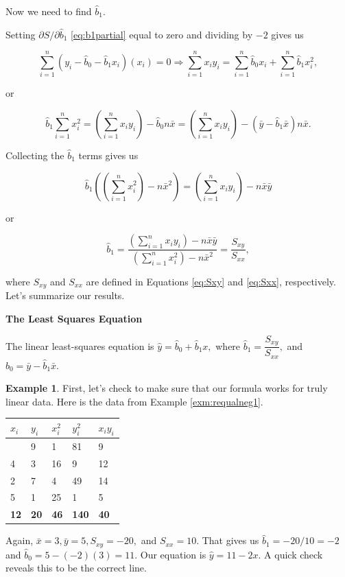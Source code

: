 \documentclass[
]{book}
\theoremstyle{definition}
\theoremstyle{definition}
\newtheorem{example}{Example}[chapter]
\theoremstyle{definition}
\theoremstyle{definition}
\theoremstyle{remark}
\begin{document}
Now we need to find \(\hat{b}_1\).

Setting \(\partial S/\partial \hat{b}_1\) \eqref{eq:b1partial} equal to zero and dividing by \(-2\) gives us

\[\sum_{i=1}^n (y_i-\hat{b}_0-\hat{b}_1x_i)(x_i)=0\Rightarrow \sum_{i=1}^n x_iy_i=\sum_{i=1}^n \hat{b}_0x_i+\sum_{i=1}^n\hat{b}_1x_i^2,\]

or

\[\hat{b}_1\sum_{i=1}^n x_i^2=\left(\sum_{i=1}^nx_iy_i\right)-\hat{b}_0 n\bar{x}=\left(\sum_{i=1}^nx_iy_i\right)-(\bar{y}-\hat{b}_1\bar{x})n\bar{x}.\]

Collecting the \(\hat{b}_1\) terms gives us

\[\hat{b}_1\left(\left(\sum_{i=1}^nx_i^2\right)-n\bar{x}^2\right)=\left(\sum_{i=1}^nx_iy_i\right)-n\bar{x}\bar{y}\]

or

\begin{equation}
\boxed{\hat{b}_1=\frac{\left(\sum_{i=1}^nx_iy_i\right)-n\bar{x}\bar{y}}{\left(\sum_{i=1}^nx_i^2\right)-n\bar{x}^2}=\frac{S_{xy}}{S_{xx}},}
\label{eq:slope}
\end{equation}

where \(S_{xy}\) and \(S_{xx}\) are defined in Equations \eqref{eq:Sxy} and \eqref{eq:Sxx}, respectively. Let's summarize our results.

\begin{propbox}
\textbf{The Least Squares Equation}

The linear least-squares equation is \(\hat{y}=\hat{b}_0+\hat{b}_1 x,\) where \(\hat{b}_1=\dfrac{S_{xy}}{S_{xx}},\) and \(\hat{b}_0=\bar{y}-\hat{b}_1 \bar{x}.\)

\end{propbox}

\begin{examplebox}

\begin{example}
First, let's check to make sure that our formula works for truly linear data. Here is the data from Example \ref{exm:requalneg1}.

\begin{longtable}[]{@{}lllll@{}}
\toprule\noalign{}
\(x_i\) & \(y_i\) & \(x_i^2\) & \(y_i^2\) & \(x_i y_i\) \\
\midrule\noalign{}
\endhead
\bottomrule\noalign{}
\endlastfoot
1 & 9 & 1 & 81 & 9 \\
4 & 3 & 16 & 9 & 12 \\
2 & 7 & 4 & 49 & 14 \\
5 & 1 & 25 & 1 & 5 \\
\textbf{12} & \textbf{20} & \textbf{46} & \textbf{140} & \textbf{40} \\
\end{longtable}

Again, \(\bar{x}=3, \bar{y}=5, S_{xy}=-20,\) and \(S_{xx}=10.\) That gives us \(\hat{b}_1=-20/10=-2\) and \(\hat{b}_0=5-(-2)(3)=11.\) Our equation is \(\hat{y}=11-2x.\) A quick check reveals this to be the correct line.
\end{example}

\end{examplebox}
\end{document}
